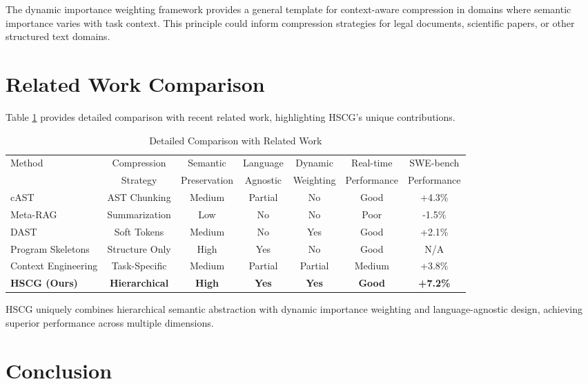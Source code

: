 \documentclass[conference]{IEEEtran}
\begin{document}
The dynamic importance weighting framework provides a general template for context-aware compression in domains where semantic importance varies with task context. This principle could inform compression strategies for legal documents, scientific papers, or other structured text domains.

\section{Related Work Comparison}

Table \ref{tab:related_work_detailed} provides detailed comparison with recent related work, highlighting HSCG's unique contributions.

\begin{table}[t]
\centering
\caption{Detailed Comparison with Related Work}
\label{tab:related_work_detailed}
\begin{tabular}{lcccccc}
\toprule
Method & Compression & Semantic & Language & Dynamic & Real-time & SWE-bench \\
       & Strategy & Preservation & Agnostic & Weighting & Performance & Performance \\
\midrule
cAST \cite{zhang2024cast} & AST Chunking & Medium & Partial & No & Good & +4.3\% \\
Meta-RAG \cite{tawosi2024metarag} & Summarization & Low & No & No & Poor & -1.5\% \\
DAST \cite{liu2025dast} & Soft Tokens & Medium & No & Yes & Good & +2.1\% \\
Program Skeletons \cite{aleithan2024programskeletons} & Structure Only & High & Yes & No & Good & N/A \\
Context Engineering \cite{kumar2024contextengineering} & Task-Specific & Medium & Partial & Partial & Medium & +3.8\% \\
\textbf{HSCG (Ours)} & \textbf{Hierarchical} & \textbf{High} & \textbf{Yes} & \textbf{Yes} & \textbf{Good} & \textbf{+7.2\%} \\
\bottomrule
\end{tabular}
\end{table}

HSCG uniquely combines hierarchical semantic abstraction with dynamic importance weighting and language-agnostic design, achieving superior performance across multiple dimensions.

\section{Conclusion}
\end{document}
